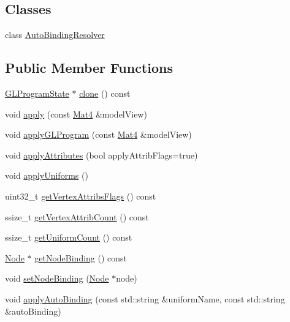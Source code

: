 \subsection*{Classes}
\begin{DoxyCompactItemize}
\item 
class \hyperlink{classGLProgramState_1_1AutoBindingResolver}{Auto\+Binding\+Resolver}
\end{DoxyCompactItemize}
\subsection*{Public Member Functions}
\begin{DoxyCompactItemize}
\item 
\hyperlink{classGLProgramState}{G\+L\+Program\+State} $\ast$ \hyperlink{classGLProgramState_a60985933fbcc9d05da3765aa770c37ab}{clone} () const
\item 
void \hyperlink{classGLProgramState_a3bd47e0176e61945893c4227cf50dc8d}{apply} (const \hyperlink{classMat4}{Mat4} \&model\+View)
\item 
void \hyperlink{classGLProgramState_a2caeee298087f126c4460752a6f42bc5}{apply\+G\+L\+Program} (const \hyperlink{classMat4}{Mat4} \&model\+View)
\item 
void \hyperlink{classGLProgramState_af524cc2e3b621997336d5b58f221c624}{apply\+Attributes} (bool apply\+Attrib\+Flags=true)
\item 
void \hyperlink{classGLProgramState_ac673949ce3b48aa2a31ad2457bfa5a2c}{apply\+Uniforms} ()
\item 
uint32\+\_\+t \hyperlink{classGLProgramState_a05e1e9950fe6200b8ca7819e8f5e1271}{get\+Vertex\+Attribs\+Flags} () const
\item 
ssize\+\_\+t \hyperlink{classGLProgramState_af106445181df4e066f599418232e6b7e}{get\+Vertex\+Attrib\+Count} () const
\item 
ssize\+\_\+t \hyperlink{classGLProgramState_abdad543ece51ec3b98ff59d4bc4e75f6}{get\+Uniform\+Count} () const
\item 
\hyperlink{classNode}{Node} $\ast$ \hyperlink{classGLProgramState_afd883d9c022e161039fcec12778a9963}{get\+Node\+Binding} () const
\item 
void \hyperlink{classGLProgramState_a4d96305b053c642b99d4e97ea17f7f21}{set\+Node\+Binding} (\hyperlink{classNode}{Node} $\ast$node)
\item 
void \hyperlink{classGLProgramState_a495c04e63419504e616bae7795bf0af9}{apply\+Auto\+Binding} (const std\+::string \&uniform\+Name, const std\+::string \&auto\+Binding)

\end{DoxyCompactItemize}
